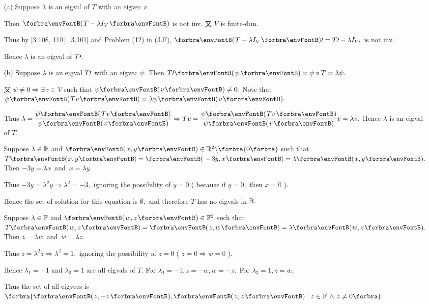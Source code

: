 \documentclass[a4paper, 11pt, UTF8]{article}
\begin{document}
\begin{large}
\par\quad
(a) Suppose $\lambda$ is an eigval of $T$ with an eigvec $v$.\par\par\quad\Ha
Then $\Par{T-\lambda I_V}$ is not inv. 又 $V$ is finite-dim.\par\quad\Ha
Thus by [3.108, 110], [3.101] and Problem (12) in (3.F), $\Par{T-\lambda I_V}\apostrophe=T\apostrophe-\lambda I_{V\apostrophe}$ is not inv.\par\quad\Ha
Hence $\lambda$ is an eigval of $T\prime.$\par\quad
(b) Suppose $\lambda$ is an eigval $T\prime$ with an eigvec $\psi.$ Then $T\apostrophe\Par{\psi}=\psi\circ T=\lambda\psi.$\par\quad\Hb
又 $\psi\neq 0\Rightarrow\exists\,v\in V$ such that $\psi\Par{v}\neq 0.$ Note that $\psi\Par{Tv}=\lambda\psi\Par{v}.$\par\quad\Hb
Thus $\lambda=\displaystyle\frac{\psi\Par{Tv}}{\psi\Par{v}}\Rightarrow Tv=\frac{\psi\Par{Tv}}{\psi\Par{v}}v=\lambda v.$
Hence $\lambda$ is an eigval of $T.$\PfEnd
\SepLine


\par\quad
Suppose $\lambda\in{\mathbb{R}}$ and $\Par{x,y}\in\Rbb^2\backslash\zeroSubs$ such that $T\Par{x,y}=\Par{-3y,x}=\lambda \Par{x,y}.$ Then $-3y=\lambda x$ \,{\small and}\, $x=\lambda y.$\par\quad
Thus $-3y=\lambda^2 y\Rightarrow \lambda^2=-3,$ ignoring the possibility of $y=0$ ( because if $y=0,$ then $x=0$ ).\par\quad
Hence the set of solution for this equation is $\emptyset,$ and therefore $T$ has no eigvals in ${\mathbb{R}}.$\PfEnd
\SepLine

\par\quad
Suppose $\lambda\in{\mathbb{F}}$ and $\Par{w,z}\in\Fbb^2$ such that $T\Par{w,z}=\Par{z,w}=\lambda\Par{w,z}.$ Then $z=\lambda w$ \,{\small and}\, $ w=\lambda z.$\par\quad
Thus $z=\lambda^2 z\Rightarrow \lambda^2=1,$ ignoring the possibility of $z=0$ ( $z=0\Rightarrow w=0$ ).\par\quad
Hence $\lambda_1=-1$ and $\lambda_2=1$ are all eigvals of $T$. For $\lambda_1=-1,z=-w,w=-z;$\,\,For $\lambda_2=1,z=w.$\par\quad
Thus the set of all eigvecs is $\Bra{\Par{z,-z},\Par{z,z}:z\in\Fbb\,\wedge\,z\neq 0}.$\PfEnd
\par
\SepLine


\end{large}
\end{document}
